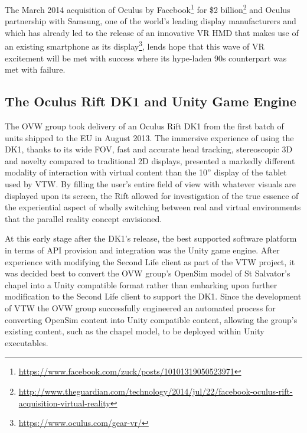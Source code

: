 The March 2014 acquisition of Oculus by Facebook\footnote{\url{https://www.facebook.com/zuck/posts/10101319050523971}} for \$2 billion\footnote{\url{http://www.theguardian.com/technology/2014/jul/22/facebook-oculus-rift-acquisition-virtual-reality}} and Oculus partnership with Samsung, one of the world's leading display manufacturers and which has already led to the release of an innovative VR HMD that makes use of an existing smartphone as its display\footnote{\url{https://www.oculus.com/gear-vr/}}, lends hope that this wave of VR excitement will be met with success where its hype-laden 90s counterpart was met with failure.




\subsection{The Oculus Rift DK1 and Unity Game Engine}

The OVW group took delivery of an Oculus Rift DK1 from the first batch of units shipped to the EU in August 2013. The immersive experience of using the DK1, thanks to its wide FOV, fast and accurate head tracking, stereoscopic 3D and novelty compared to traditional 2D displays, presented a markedly different modality of interaction with virtual content than the 10'' display of the tablet used by VTW. By filling the user's entire field of view with whatever visuals are displayed upon its screen, the Rift allowed for investigation of the true essence of the experiential aspect of wholly switching between real and virtual environments that the parallel reality concept envisioned.

At this early stage after the DK1's release, the best supported software platform in terms of API provision and integration was the Unity game engine. After experience with modifying the Second Life client as part of the VTW project, it was decided best to convert the OVW group's OpenSim model of St Salvator's chapel into a Unity compatible format rather than embarking upon further modification to the Second Life client to support the DK1. Since the development of VTW the OVW group successfully engineered an automated process for converting OpenSim content into Unity compatible content, allowing the group's existing content, such as the chapel model, to be deployed within Unity executables.

